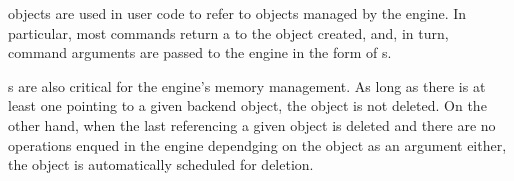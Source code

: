 \begin{cldescr}{}

 objects are used in user code to refer to objects managed by the engine. 
In particular, most  commands return a  to the object created, and, in turn, 
command arguments are passed to the engine in the form of s. 

s are also critical for the engine's memory management. As long as there is 
at least one  pointing to a given backend object, the object is not deleted. 
On the other hand, when the last  referencing a given object is deleted and 
there are no operations enqued in the engine dependging on the object as an argument either, 
the object is automatically scheduled for deletion. 
\end{cldescr}